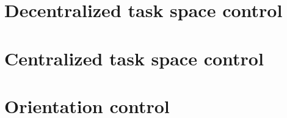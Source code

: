 \documentclass[12pt]{article}
\begin{document}
\makefrontpage
\section{Decentralized task space control}

\newpage

\newpage

\newpage

\newpage

\newpage

\newpage

\newpage

\section{Centralized task space control}

\newpage

\newpage

\newpage

\section{Orientation control}

\newpage

\end{document}

